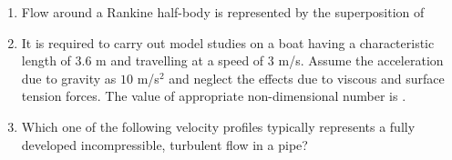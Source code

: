 \documentclass[a4paper,10pt]{article}
\begin{document}
\begin{enumerate}
    \item Flow around a Rankine half-body is represented by the superposition of
    
    \hfill{}
    \begin{enumerate}[label=\Alph*)]
    \end{enumerate}

    \item It is required to carry out model studies on a boat having a characteristic length of $3.6$ m and travelling at a speed of $3$ m/s. Assume the acceleration due to gravity as $10$ m/s$^2$ and neglect the effects due to viscous and surface tension forces. The value of appropriate non-dimensional number is \underline{\hspace{2cm}}.
    
    \hfill{}
    
    \item Which one of the following velocity profiles typically represents a fully developed incompressible, turbulent flow in a pipe?
    

\end{enumerate}
\end{document}
